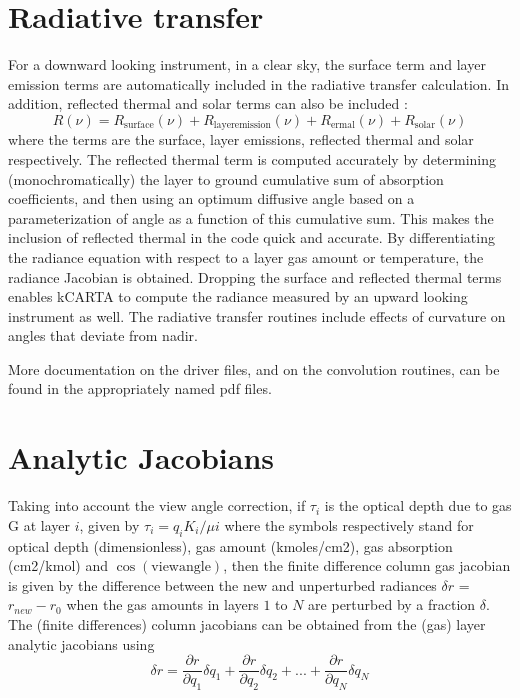 \documentclass[11pt]{article}
\newcommand{\kc}{kCARTA }
\begin{document}
\section{Radiative transfer}
For a downward looking instrument, in a clear sky, 
the surface term and layer emission terms are automatically included in the 
radiative transfer calculation.  In addition, reflected thermal and solar 
terms can also be included  :
\begin{equation}
R(\nu) = R_{\mathrm{surface}}(\nu) + R_{\mathrm{layer emission}}(\nu) + 
R_{\mathrm{ermal}}(\nu) + R_{\mathrm{solar}}(\nu)
\end{equation}
where the terms are the surface, layer emissions, reflected thermal
and solar respectively.  The reflected thermal term is computed
accurately by determining (monochromatically) the layer to ground
cumulative sum of absorption coefficients, and then using an optimum
diffusive angle based on a parameterization of angle as a function of
this cumulative sum.  This makes the inclusion of reflected thermal in
the code quick and accurate.   By differentiating the radiance equation
with respect to a layer gas amount or temperature, the radiance
Jacobian is obtained.  Dropping the surface and reflected thermal terms
enables \kc to compute the radiance measured by an upward looking
instrument as well. The radiative transfer routines include effects of
curvature on angles that deviate from nadir.

More documentation on the driver files, and on the convolution routines, 
can be found in the appropriately named pdf files.

\section{Analytic Jacobians}
Taking into account the view angle correction, if $\tau_{i}$ is the
optical depth due to gas G at layer $i$, given by
$\tau_{i} = q_{i} K_{i}/\mu{i}$ where the symbols respectively stand
for optical depth (dimensionless), gas amount (kmoles/cm2), gas
absorption (cm2/kmol) and $\cos(\mathrm{view angle})$, then the finite
difference column gas jacobian is given by the difference between the
new and unperturbed radiances $\delta r$ = $r_{new} - r_{0}$ when the
gas amounts in layers $1$ to $N$ are perturbed by a fraction
$\delta$. The (finite differences) column jacobians can be obtained
from the (gas) layer analytic jacobians using
\[
\delta r = \frac{\partial r}{\partial q_1} \delta q_1 + 
           \frac{\partial r}{\partial q_2} \delta q_2 + ... + 
           \frac{\partial r}{\partial q_N} \delta q_N
\] 
\end{document}
